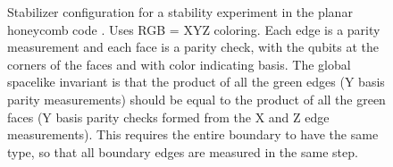 \documentclass[onecolumn,unpublished,a4paper]{quantumarticle}
\theoremstyle{definition}
\theoremstyle{definition}
\theoremstyle{definition}
\begin{document}
\begin{figure}
    \centering
    \caption{
        Stabilizer configuration for a stability experiment in the planar honeycomb code \cite{hastings2021dynamically,gidney2021honeycombmemory,haah2021boundaries,gidney2022benchmarking,paetznick2022performance}.
        Uses RGB = XYZ coloring.
        Each edge is a parity measurement and each face is a parity check, with the qubits at the corners of the faces and with color indicating basis.
        The global spacelike invariant is that the product of all the green edges (Y basis parity measurements) should be equal to the product of all the green faces (Y basis parity checks formed from the X and Z edge measurements).
        This requires the entire boundary to have the same type, so that all boundary edges are measured in the same step.
    }
    \label{fig:honeycomb_stability}
\end{figure}
\end{document}

